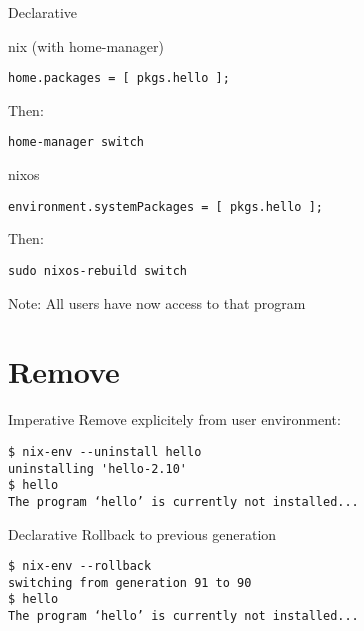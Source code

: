 \documentclass[smaller]{beamer}
\begin{document}
\begin{block}{Declarative}
\begin{block}{nix (with home-manager)}
\begin{verbatim}
home.packages = [ pkgs.hello ];
\end{verbatim}

Then:\\
\begin{verbatim}
home-manager switch
\end{verbatim}
\end{block}

\begin{block}{nixos}
\begin{verbatim}
environment.systemPackages = [ pkgs.hello ];
\end{verbatim}

Then:\\
\begin{verbatim}
sudo nixos-rebuild switch
\end{verbatim}

Note: All users have now access to that program\\
\end{block}
\end{block}

\section{Remove}
\label{sec:orge02497a}
\begin{block}{Imperative}
Remove explicitely from user environment:\\

\begin{verbatim}
$ nix-env --uninstall hello
uninstalling 'hello-2.10'
$ hello
The program ‘hello’ is currently not installed...
\end{verbatim}
\end{block}

\begin{block}{Declarative}
Rollback to previous generation\\

\begin{verbatim}
$ nix-env --rollback
switching from generation 91 to 90
$ hello
The program ‘hello’ is currently not installed...
\end{verbatim}
\end{block}
\end{document}
